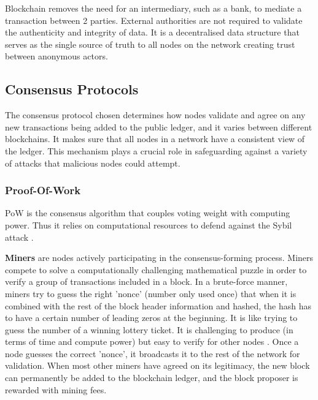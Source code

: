 Blockchain removes the need for an intermediary, such as a bank, to mediate a transaction between 2 parties. External authorities are not required to validate the authenticity and integrity of data. It is a decentralised data structure that serves as the single source of truth to all nodes on the network creating trust between anonymous actors.




\subsection{Consensus Protocols}

The consensus protocol chosen determines how nodes validate and agree on any new transactions being added to the public ledger, and it varies between different blockchains. It makes sure that all nodes in a network have a consistent view of the ledger. This mechanism plays a crucial role in safeguarding against a variety of attacks that malicious nodes could attempt.

\subsubsection{Proof-Of-Work}

PoW is the consensus algorithm that couples voting weight with computing 
power. Thus it relies on computational resources to defend against the Sybil attack \cite{Sedlmeir2020TheMyth}.

\textbf{Miners} are nodes actively participating in the consensus-forming process. Miners compete 
to solve a computationally challenging mathematical puzzle in order to verify a group of transactions included in a block. In a brute-force manner, miners try to guess the right 'nonce' (number only used once) that when it is combined with the rest of the block header information and hashed, the hash has to have a certain number of leading zeros at the beginning. It is like trying to guess the number of a winning lottery ticket. It is challenging to produce (in terms of time and compute power) but easy to verify for other nodes \cite{Centieiro2021BitcoinCoding}. Once a node guesses the correct 'nonce', it broadcasts it to the rest of the network for validation. When most other miners have agreed on its legitimacy, the new block can permanently be added to the blockchain ledger, and the block proposer is rewarded with mining fees.

